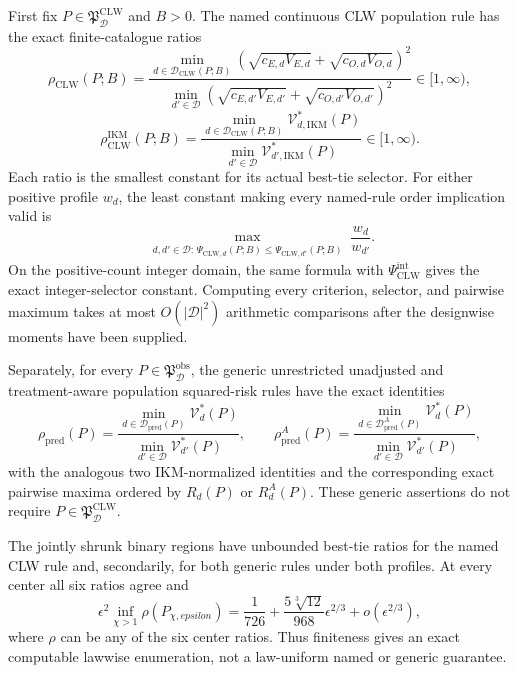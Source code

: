 First fix \(P\in\mathfrak P_{\mathcal D}^{\mathrm{CLW}}\) and \(B>0\). The named continuous CLW population rule has the exact finite-catalogue ratios
\[
 \rho_{\mathrm{CLW}}(P;B)
 =\frac{\min_{d\in\mathcal D_{\mathrm{CLW}}(P;B)}
 (\sqrt{c_{E,d}V_{E,d}}+\sqrt{c_{O,d}V_{O,d}})^2}
 {\min_{d'\in\mathcal D}
 (\sqrt{c_{E,d'}V_{E,d'}}+\sqrt{c_{O,d'}V_{O,d'}})^2}
 \in[1,\infty),                                            \tag{1}
\]
\[
 \rho_{\mathrm{CLW}}^{\mathrm{IKM}}(P;B)
 =\frac{\min_{d\in\mathcal D_{\mathrm{CLW}}(P;B)}
 \mathcal V_{d,\mathrm{IKM}}^*(P)}
 {\min_{d'\in\mathcal D}\mathcal V_{d',\mathrm{IKM}}^*(P)}
 \in[1,\infty).                                            \tag{2}
\]
Each ratio is the smallest constant for its actual best-tie selector. For either positive profile \(w_d\), the least constant making every named-rule order implication valid is
\[
 \max_{\substack{d,d'\in\mathcal D:\,
 \Psi_{\mathrm{CLW},d}(P;B)
 \le\Psi_{\mathrm{CLW},d'}(P;B)}}\frac{w_d}{w_{d'}}.       \tag{3}
\]
On the positive-count integer domain, the same formula with \(\Psi_{\mathrm{CLW}}^{\mathrm{int}}\) gives the exact integer-selector constant. Computing every criterion, selector, and pairwise maximum takes at most \(O(|\mathcal D|^2)\) arithmetic comparisons after the designwise moments have been supplied.

Separately, for every \(P\in\mathfrak P_{\mathcal D}^{\mathrm{obs}}\), the generic unrestricted unadjusted and treatment-aware population squared-risk rules have the exact identities
\[
 \rho_{\mathrm{pred}}(P)
 =\frac{\min_{d\in\mathcal D_{\mathrm{pred}}(P)}\mathcal V_d^*(P)}
 {\min_{d'\in\mathcal D}\mathcal V_{d'}^*(P)},
 \qquad
 \rho_{\mathrm{pred}}^A(P)
 =\frac{\min_{d\in\mathcal D_{\mathrm{pred}}^A(P)}\mathcal V_d^*(P)}
 {\min_{d'\in\mathcal D}\mathcal V_{d'}^*(P)},            \tag{4}
\]
with the analogous two IKM-normalized identities and the corresponding exact pairwise maxima ordered by \(R_d(P)\) or \(R_d^A(P)\). These generic assertions do not require \(P\in\mathfrak P_{\mathcal D}^{\mathrm{CLW}}\).

The jointly shrunk binary regions have unbounded best-tie ratios for the named CLW rule and, secondarily, for both generic rules under both profiles. At every center all six ratios agree and
\[
 \epsilon^2\inf_{\chi>1}\rho(P_{\chi,epsilon})
 =\frac1{726}+\frac{5\sqrt[3]{12}}{968}\epsilon^{2/3}
 +o(\epsilon^{2/3}),                                       \tag{5}
\]
where \(\rho\) can be any of the six center ratios. Thus finiteness gives an exact computable lawwise enumeration, not a law-uniform named or generic guarantee.